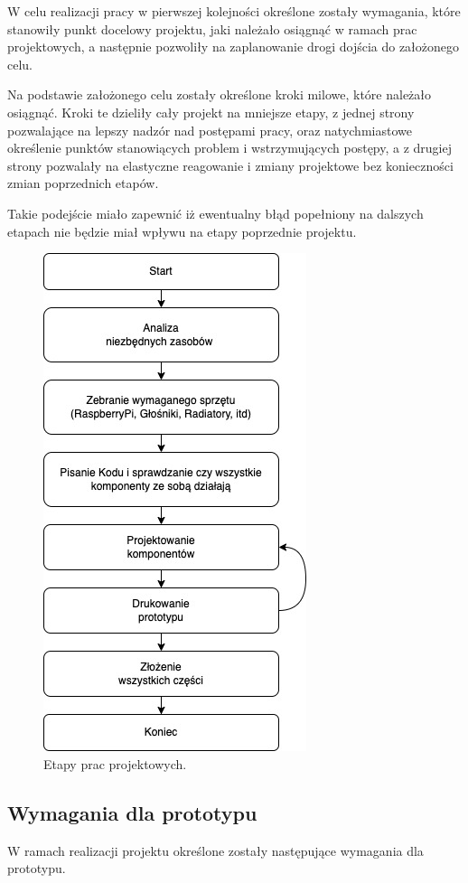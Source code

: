 \documentclass[a4paper,12pt,reqno]{article}
\begin{document}
W celu realizacji pracy w pierwszej kolejności określone zostały wymagania, które stanowiły punkt docelowy projektu, jaki należało osiągnąć w ramach prac projektowych, a następnie pozwoliły na zaplanowanie drogi dojścia do założonego celu.

Na podstawie założonego celu zostały określone kroki milowe, które należało osiągnąć. Kroki te dzieliły cały projekt na mniejsze etapy, z jednej strony pozwalające na lepszy nadzór nad postępami pracy, oraz natychmiastowe określenie punktów stanowiących problem i wstrzymujących postępy, a z drugiej strony pozwalały na elastyczne reagowanie i zmiany projektowe bez konieczności zmian poprzednich etapów.

Takie podejście miało zapewnić iż ewentualny błąd popełniony na dalszych etapach nie będzie miał wpływu na etapy poprzednie projektu.

\begin{figure}[H]%
\centering
\includegraphics[width=0.5\columnwidth]{imgs/etapy.drawio.jpg}
\caption{Etapy prac projektowych. \label{etapypracy}}
\quad
\end{figure}

\subsection{Wymagania dla prototypu}

W ramach realizacji projektu określone zostały następujące wymagania dla prototypu.
\end{document}
